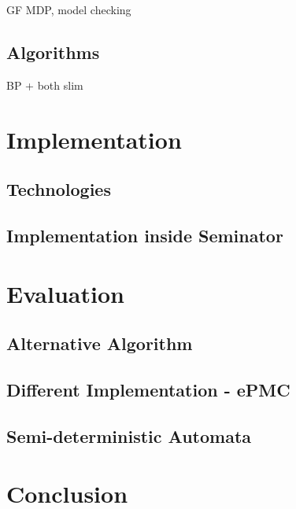 \documentclass{fithesis3}
\begin{document}
		
		GF MDP, model checking
		\section{Algorithms}
		BP + both slim 
	\chapter{Implementation}
		\section{Technologies}
		\section{Implementation inside Seminator}
	\chapter{Evaluation}
		\section{Alternative Algorithm}
		\section{Different Implementation - ePMC}
		\section{Semi-deterministic Automata}
	\chapter{Conclusion}
\end{document}

